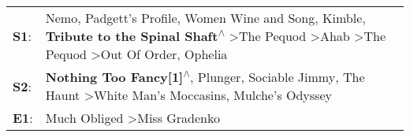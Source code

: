 \begin{supertabular}{p{0.03\textwidth}p{0.92\textwidth}}
 \textbf{S1}:  &  Nemo\textsuperscript{}, \enspace Padgett's Profile\textsuperscript{}, \enspace Women Wine and Song\textsuperscript{}, \enspace Kimble\textsuperscript{}, \enspace \textbf{Tribute to the Spinal Shaft\textsuperscript{$\wedge$}} \textgreater \enspace The Pequod\textsuperscript{} \textgreater \enspace Ahab\textsuperscript{} \textgreater \enspace The Pequod\textsuperscript{} \textgreater \enspace Out Of Order\textsuperscript{}, \enspace Ophelia\textsuperscript{}  \enspace  \\
 \textbf{S2}:  &                                                                                                                                                                                       \textbf{Nothing Too Fancy[1]\textsuperscript{$\wedge$}}, \enspace Plunger\textsuperscript{}, \enspace Sociable Jimmy\textsuperscript{}, \enspace The Haunt\textsuperscript{} \textgreater \enspace White Man's Moccasins\textsuperscript{}, \enspace Mulche's Odyssey\textsuperscript{}  \enspace  \\
 \textbf{E1}:  &                                                                                                                                                                                                                                                                                                                                                                                          Much Obliged\textsuperscript{} \textgreater \enspace Miss Gradenko\textsuperscript{}  \enspace  \\
\end{supertabular}
